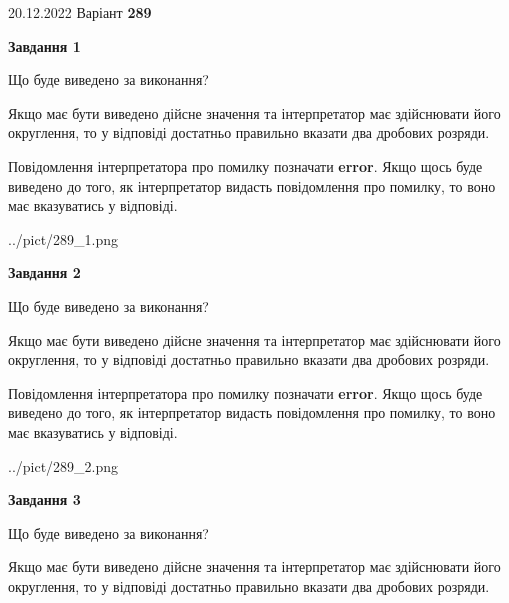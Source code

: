 \documentclass[12pt, ukrainian]{article}
\begin{document}
{20.12.2022 Варіант \No \textbf { 289 }\par}
{
\begin {Large}

{\begin {center}\textbf{Завдання 1}\end {center}}\par
Що буде виведено за виконання? \par

Якщо має бути виведено дійсне значення та інтерпретатор має здійснювати його округлення, 
то у відповіді достатньо правильно вказати два дробових розряди.

Повідомлення інтерпретатора про помилку позначати \textbf{error}.
Якщо щось буде виведено до того, як інтерпретатор видасть повідомлення про помилку, 
то воно має вказуватись у відповіді. \par

\begin{center}
	{../pict/289_1.png}
\end{center}
\newpage

{\begin {center}\textbf{Завдання 2}\end {center}}\par
Що буде виведено за виконання? \par

Якщо має бути виведено дійсне значення та інтерпретатор має здійснювати його округлення, 
то у відповіді достатньо правильно вказати два дробових розряди.

Повідомлення інтерпретатора про помилку позначати \textbf{error}.
Якщо щось буде виведено до того, як інтерпретатор видасть повідомлення про помилку, 
то воно має вказуватись у відповіді. \par

\begin{center}
	{../pict/289_2.png}
\end{center}
\newpage

{\begin {center}\textbf{Завдання 3}\end {center}}\par
Що буде виведено за виконання? \par

Якщо має бути виведено дійсне значення та інтерпретатор має здійснювати його округлення, 
то у відповіді достатньо правильно вказати два дробових розряди.


\end{Large}}
\end{document}
